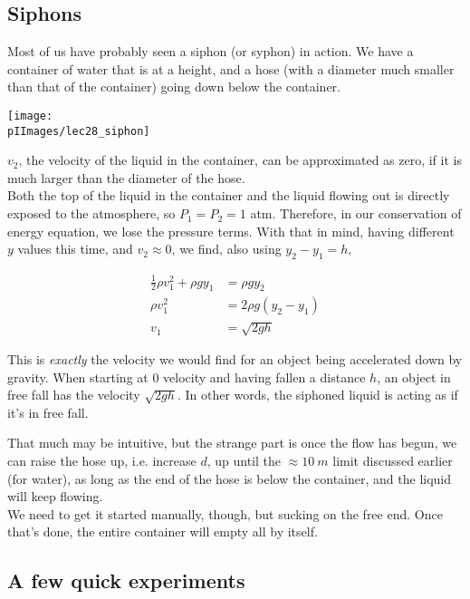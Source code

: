 \subsection{Siphons}

Most of us have probably seen a siphon (or syphon) in action. We have a container of water that is at a height, and a hose (with a diameter much smaller than that of the container) going down below the container.

\begin{center}
\texttt{[image: \\pIImages/lec28\_siphon]}
\end{center}

$v_2$, the velocity of the liquid in the container, can be approximated as zero, if it is much larger than the diameter of the hose.\\
Both the top of the liquid in the container and the liquid flowing out is directly exposed to the atmosphere, so $P_1 = P_2 = 1$ atm. Therefore, in our conservation of energy equation, we lose the pressure terms. With that in mind, having different $y$ values this time, and $v_2 \approx 0$, we find, also using $y_2 - y_1 = h$,

\begin{align}
\frac{1}{2} \rho v_1^2 + \rho g y_1 &= \rho g y_2\\
\rho v_1^2 &= 2 \rho g (y_2 - y_1)\\
v_1 &= \sqrt{2 g h}
\end{align}

This is \emph{exactly} the velocity we would find for an object being accelerated down by gravity. When starting at 0 velocity and having fallen a distance $h$, an object in free fall has the velocity $\sqrt{2 g h}$. In other words, the siphoned liquid is acting as if it's in free fall.

That much may be intuitive, but the strange part is once the flow has begun, we can raise the hose up, i.e. increase $d$, up until the $\approx \SI{10}{m}$ limit discussed earlier (for water), as long as the end of the hose is below the container, and the liquid will keep flowing.\\
We need to get it started manually, though, but sucking on the free end. Once that's done, the entire container will empty all by itself.

\subsection{A few quick experiments}

